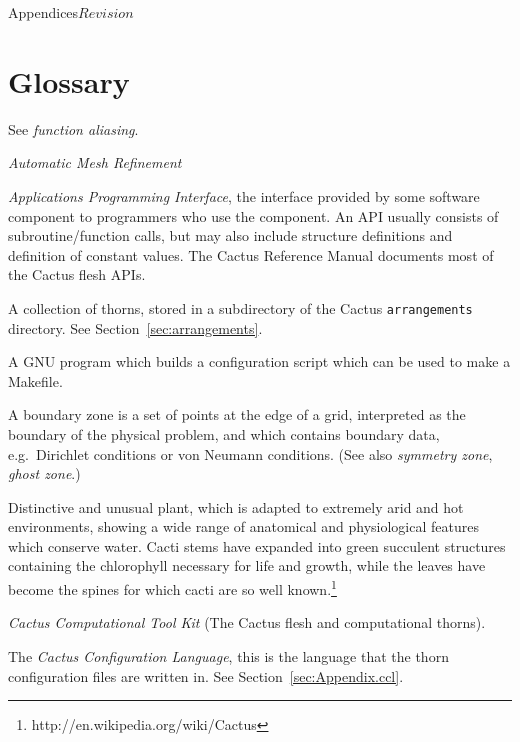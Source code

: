 
\begin{cactuspart}{Appendices}{}{$Revision$}
\label{part:Appendices}
\renewcommand{\thepage}{\Alph{part}\arabic{page}}


\chapter{Glossary}
\label{sec:glossary}

\begin{Lentry}

\item[alias function]
  See \textit{function aliasing}.
\item[AMR]
  \textit{Automatic Mesh Refinement}
\item[analysis]
\item[API]
  \textit{Applications Programming Interface}, the interface provided by
  some software component to programmers who use the component. 
  An API usually consists of subroutine/function calls, but may also include
  structure definitions and definition of constant values.
  The Cactus Reference Manual documents most of the Cactus flesh APIs.
\item[arrangement]
  A collection of thorns, stored in a subdirectory of the Cactus
  \verb|arrangements| directory.  See Section~\ref{sec:arrangements}.
\item[autoconf]
  A GNU program which builds a configuration script which can be used
  to make a Makefile.
\item[boundary zone]
  A boundary zone is a set of points at the edge of a grid, interpreted as
  the boundary of the physical problem, and which contains boundary data,
  e.g.\ Dirichlet conditions or von Neumann conditions.
  (See also \textit{symmetry zone}, \textit{ghost zone}.)
\item[Cactus]
Distinctive and unusual plant, which is adapted to extremely arid and hot environments, showing a wide range of anatomical and physiological features which conserve water. Cacti stems have expanded into green succulent structures containing the chlorophyll necessary for life and growth, while the leaves have become the spines for which cacti are so well known.\footnote{%
http://en.wikipedia.org/wiki/Cactus
       }%
\item[CCTK]
  \textit{Cactus Computational Tool Kit} (The Cactus flesh and computational
  thorns).
\item[CCL]
  The \textit{Cactus Configuration Language}, this is the language that
  the thorn configuration files are written in.
  See Section~\ref{sec:Appendix.ccl}.


\end{Lentry}
\end{cactuspart}
